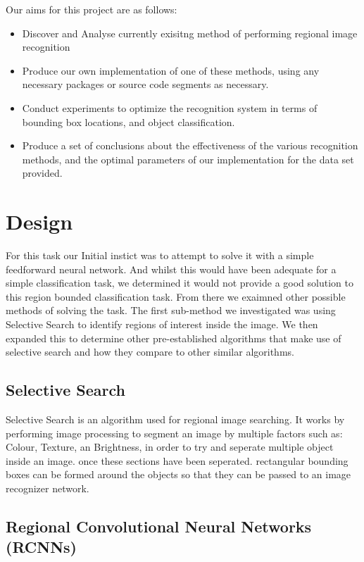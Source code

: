 \documentclass[11pt]{article}
\begin{document}
Our aims for this project are as follows:

\begin{itemize}
\item
  Discover and Analyse currently exisitng method of performing regional
  image recognition
\item
  Produce our own implementation of one of these methods, using any
  necessary packages or source code segments as necessary.
\item
  Conduct experiments to optimize the recognition system in terms of
  bounding box locations, and object classification.
\item
  Produce a set of conclusions about the effectiveness of the various
  recognition methods, and the optimal parameters of our implementation
  for the data set provided.
\end{itemize}

    \section{Design}\label{design}

For this task our Initial instict was to attempt to solve it with a
simple feedforward neural network. And whilst this would have been
adequate for a simple classification task, we determined it would not
provide a good solution to this region bounded classification task. From
there we exaimned other possible methods of solving the task. The first
sub-method we investigated was using Selective Search to identify
regions of interest inside the image. We then expanded this to determine
other pre-established algorithms that make use of selective search and
how they compare to other similar algorithms.

\subsection{Selective Search}\label{selective-search}

Selective Search is an algorithm used for regional image searching. It
works by performing image processing to segment an image by multiple
factors such as: Colour, Texture, an Brightness, in order to try and
seperate multiple object inside an image. once these sections have been
seperated. rectangular bounding boxes can be formed around the objects
so that they can be passed to an image recognizer network.

\subsection{Regional Convolutional Neural Networks
(RCNNs)}\label{regional-convolutional-neural-networks-rcnns}
\end{document}
